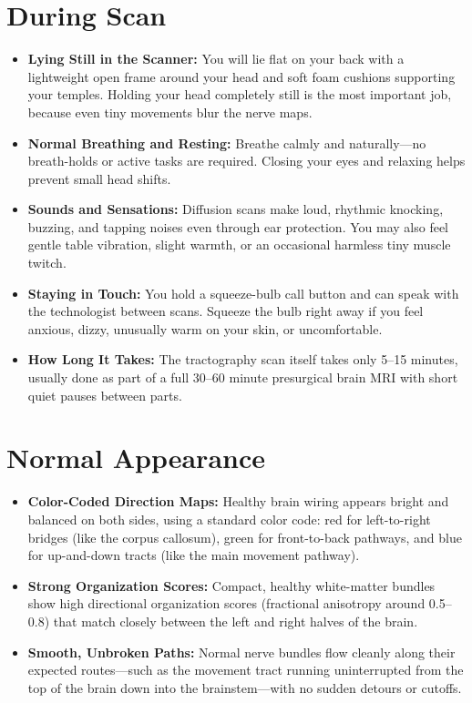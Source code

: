 \section{During Scan}

\begin{itemize}
    \item \textbf{Lying Still in the Scanner:} You will lie flat on your back with a lightweight open frame around your head and soft foam cushions supporting your temples. Holding your head completely still is the most important job, because even tiny movements blur the nerve maps.
    \item \textbf{Normal Breathing and Resting:} Breathe calmly and naturally---no breath-holds or active tasks are required. Closing your eyes and relaxing helps prevent small head shifts.
    \item \textbf{Sounds and Sensations:} Diffusion scans make loud, rhythmic knocking, buzzing, and tapping noises even through ear protection. You may also feel gentle table vibration, slight warmth, or an occasional harmless tiny muscle twitch.
    \item \textbf{Staying in Touch:} You hold a squeeze-bulb call button and can speak with the technologist between scans. Squeeze the bulb right away if you feel anxious, dizzy, unusually warm on your skin, or uncomfortable.
    \item \textbf{How Long It Takes:} The tractography scan itself takes only 5--15 minutes, usually done as part of a full 30--60 minute presurgical brain MRI with short quiet pauses between parts.
\end{itemize}

\section{Normal Appearance}

\begin{itemize}
    \item \textbf{Color-Coded Direction Maps:} Healthy brain wiring appears bright and balanced on both sides, using a standard color code: red for left-to-right bridges (like the corpus callosum), green for front-to-back pathways, and blue for up-and-down tracts (like the main movement pathway).
    \item \textbf{Strong Organization Scores:} Compact, healthy white-matter bundles show high directional organization scores (fractional anisotropy around 0.5--0.8) that match closely between the left and right halves of the brain.
    \item \textbf{Smooth, Unbroken Paths:} Normal nerve bundles flow cleanly along their expected routes---such as the movement tract running uninterrupted from the top of the brain down into the brainstem---with no sudden detours or cutoffs.
\end{itemize}

